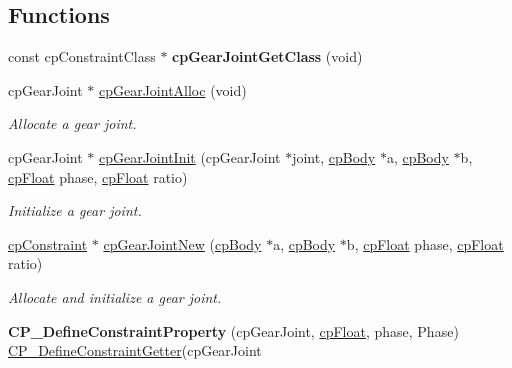 \subsection*{Functions}
\begin{DoxyCompactItemize}
\item 
\hypertarget{group__cp_gear_joint_ga91c50bbc5352385ba427177b31e75d3c}{const cp\-Constraint\-Class $\ast$ {\bfseries cp\-Gear\-Joint\-Get\-Class} (void)}\label{group__cp_gear_joint_ga91c50bbc5352385ba427177b31e75d3c}

\item 
\hypertarget{group__cp_gear_joint_gaa2c7e23592c34b5a4ce2614147bb2199}{cp\-Gear\-Joint $\ast$ \hyperlink{group__cp_gear_joint_gaa2c7e23592c34b5a4ce2614147bb2199}{cp\-Gear\-Joint\-Alloc} (void)}\label{group__cp_gear_joint_gaa2c7e23592c34b5a4ce2614147bb2199}

\begin{DoxyCompactList}\small\item\em Allocate a gear joint. \end{DoxyCompactList}\item 
\hypertarget{group__cp_gear_joint_ga80357534ab155c34491b87e8534547a3}{cp\-Gear\-Joint $\ast$ \hyperlink{group__cp_gear_joint_ga80357534ab155c34491b87e8534547a3}{cp\-Gear\-Joint\-Init} (cp\-Gear\-Joint $\ast$joint, \hyperlink{structcp_body}{cp\-Body} $\ast$a, \hyperlink{structcp_body}{cp\-Body} $\ast$b, \hyperlink{group__basic_types_gac1ed65573e035bf892505768c852d8d3}{cp\-Float} phase, \hyperlink{group__basic_types_gac1ed65573e035bf892505768c852d8d3}{cp\-Float} ratio)}\label{group__cp_gear_joint_ga80357534ab155c34491b87e8534547a3}

\begin{DoxyCompactList}\small\item\em Initialize a gear joint. \end{DoxyCompactList}\item 
\hypertarget{group__cp_gear_joint_ga4e2d47ad6065e8449636509835e959fa}{\hyperlink{structcp_constraint}{cp\-Constraint} $\ast$ \hyperlink{group__cp_gear_joint_ga4e2d47ad6065e8449636509835e959fa}{cp\-Gear\-Joint\-New} (\hyperlink{structcp_body}{cp\-Body} $\ast$a, \hyperlink{structcp_body}{cp\-Body} $\ast$b, \hyperlink{group__basic_types_gac1ed65573e035bf892505768c852d8d3}{cp\-Float} phase, \hyperlink{group__basic_types_gac1ed65573e035bf892505768c852d8d3}{cp\-Float} ratio)}\label{group__cp_gear_joint_ga4e2d47ad6065e8449636509835e959fa}

\begin{DoxyCompactList}\small\item\em Allocate and initialize a gear joint. \end{DoxyCompactList}\item 
\hypertarget{group__cp_gear_joint_ga73b8fbe67562e4252c0f836ced864051}{{\bfseries C\-P\-\_\-\-Define\-Constraint\-Property} (cp\-Gear\-Joint, \hyperlink{group__basic_types_gac1ed65573e035bf892505768c852d8d3}{cp\-Float}, phase, Phase) \hyperlink{group__cp_groove_joint_ga05a054f39842ddc8f5d3e92eb6ce5d71}{C\-P\-\_\-\-Define\-Constraint\-Getter}(cp\-Gear\-Joint}\label{group__cp_gear_joint_ga73b8fbe67562e4252c0f836ced864051}


\end{DoxyCompactItemize}
